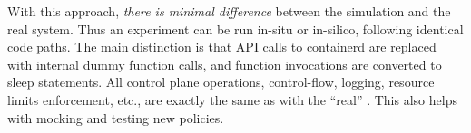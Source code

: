 With this approach, \emph{there is minimal difference} between the simulation and the real system. 
Thus an experiment can be run in-situ or in-silico, following identical code paths.
The main distinction is that API calls to containerd are replaced with internal dummy function calls, and function invocations are converted to sleep statements.  
All control plane operations, control-flow, logging, resource limits enforcement, etc., are exactly the same as with the ``real'' \sysname.
This also helps with mocking and testing new policies. 



